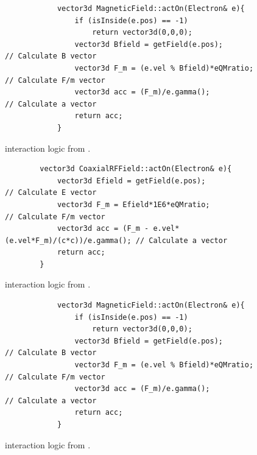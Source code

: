 \documentclass[a4paper,oneside,12pt]{report}
\numberwithin{equation}{chapter}
\begin{document}
{\begin{figure}[H]
    \begin{minipage}{\textwidth}
        \begin{verbatim}
            vector3d MagneticField::actOn(Electron& e){
                if (isInside(e.pos) == -1)
                    return vector3d(0,0,0);
                vector3d Bfield = getField(e.pos);                          // Calculate B vector
                vector3d F_m = (e.vel % Bfield)*eQMratio;                   // Calculate F/m vector
                vector3d acc = (F_m)/e.gamma();                             // Calculate a vector
                return acc;
            }
        \end{verbatim}
    \end{minipage}
    \vspace{20pt}
    \caption{\eEM  interaction logic from .}
    \label{fig:3D_e_EM_interaction_first}
\end{figure}\fi
\begin{figure}[H]
    \begin{verbatim}
        vector3d CoaxialRFField::actOn(Electron& e){
            vector3d Efield = getField(e.pos);                        // Calculate E vector
            vector3d F_m = Efield*1E6*eQMratio;                       // Calculate F/m vector
            vector3d acc = (F_m - e.vel*(e.vel*F_m)/(c*c))/e.gamma(); // Calculate a vector
            return acc;
        }
    \end{verbatim}
    \vspace{20pt}
    \caption{\eE interaction logic from .}
    \label{fig:3D_e_E_interaction_first}
\end{figure}
\vspace{20pt}
\begin{figure}[H]
        \begin{verbatim}
            vector3d MagneticField::actOn(Electron& e){
                if (isInside(e.pos) == -1)
                    return vector3d(0,0,0);
                vector3d Bfield = getField(e.pos);                        // Calculate B vector
                vector3d F_m = (e.vel % Bfield)*eQMratio;                 // Calculate F/m vector
                vector3d acc = (F_m)/e.gamma();                           // Calculate a vector
                return acc;
            }
        \end{verbatim}
    \vspace{20pt}
    \caption{\eB interaction logic from .}
    \label{fig:3D_e_B_interaction_first}
\end{figure}

}
\end{document}
